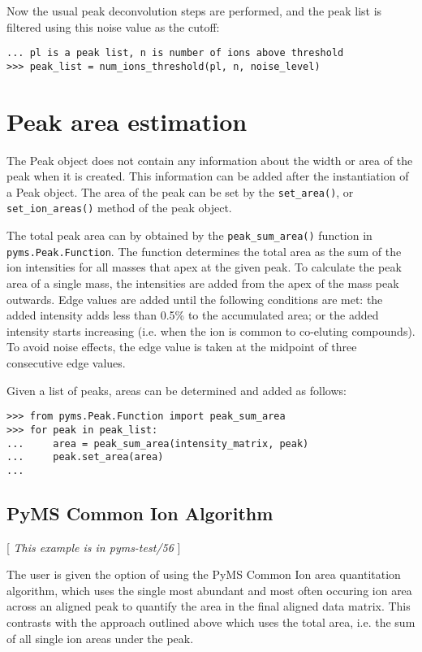 Now the usual peak deconvolution steps are performed, and the peak list is filtered
using this noise value as the cutoff:

\begin{verbatim}
... pl is a peak list, n is number of ions above threshold
>>> peak_list = num_ions_threshold(pl, n, noise_level)
\end{verbatim}


\section{Peak area estimation}


The Peak object does not contain any information about the width or
area of the peak when it is created. This information can be added
after the instantiation of a Peak object. The area of the peak can be
set by the {\tt set\_area()}, or {\tt set\_ion\_areas()} method of the
peak object.


The total peak area can by obtained by the {\tt peak\_sum\_area()}
function in {\tt pyms.Peak.Function}. The function determines the
total area as the sum of the ion intensities for all masses that apex
at the given peak. To calculate the peak area of a single mass, the
intensities are added from the apex of the mass peak outwards. Edge
values are added until the following conditions are met: the added
intensity adds less than 0.5\% to the accumulated area; or the added
intensity starts increasing (i.e. when the ion is common to co-eluting
compounds). To avoid noise effects, the edge value is taken at the
midpoint of three consecutive edge values.

Given a list of peaks, areas can be determined and added as follows:
\begin{verbatim}
>>> from pyms.Peak.Function import peak_sum_area
>>> for peak in peak_list:
...     area = peak_sum_area(intensity_matrix, peak)
...     peak.set_area(area)
...
\end{verbatim}

\subsection{PyMS Common Ion Algorithm}

[ {\em This example is in pyms-test/56} ]

The user is given the option of using the PyMS Common Ion area
quantitation algorithm, which uses the single most abundant and most
often occuring ion area across an aligned peak to quantify the area in
the final aligned data matrix. This contrasts with the approach
outlined above which uses the total area, i.e. the sum of all
single ion areas under the peak.

